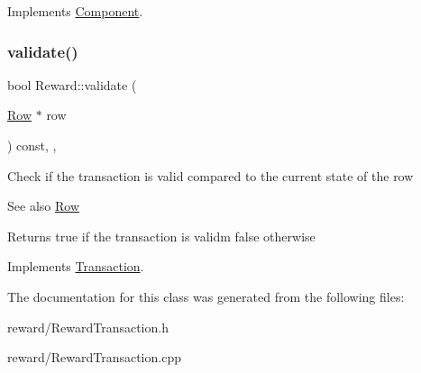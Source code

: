 Implements \mbox{\hyperlink{classComponent_a3e63d8c993e417a4af3f56d65ebfc7ea}{Component}}.

\mbox{\label{classReward_a9c9a3219ba6b8b068f7f1cccc779b1b5}} 
\subsubsection{\texorpdfstring{validate()}{validate()}}
{\footnotesize\ttfamily bool Reward\+::validate (\begin{DoxyParamCaption}\item[{\mbox{\hyperlink{classRow}{Row}} $\ast$}]{row }\end{DoxyParamCaption}) const\hspace{0.3cm}{\ttfamily [final]}, {\ttfamily [virtual]}, {\ttfamily [inherited]}}

Check if the transaction is valid compared to the current state of the row \begin{DoxySeeAlso}{See also}
\mbox{\hyperlink{classRow}{Row}}
\end{DoxySeeAlso}
\begin{DoxyReturn}{Returns}
true if the transaction is validm false otherwise 
\end{DoxyReturn}


Implements \mbox{\hyperlink{classTransaction_a638518143f0defde1c3c73e33db1b7f1}{Transaction}}.



The documentation for this class was generated from the following files\+:\begin{DoxyCompactItemize}
\item 
reward/Reward\+Transaction.\+h\item 
reward/Reward\+Transaction.\+cpp\end{DoxyCompactItemize}
